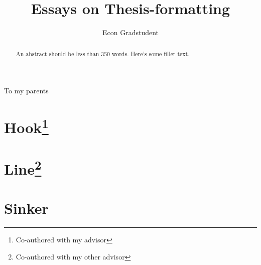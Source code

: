\documentclass[12pt]{gsasthesis} %
\title{Essays on Thesis-formatting}
\author{Econ Gradstudent} %
\begin{document}


\thesistitlepage
\copyrightpage
\begin{abstract}
  An abstract should be less than 350 words. Here's some filler text. \blindtext
\end{abstract}
\tableofcontents %

\listoftables
\listoffigures
\begin{acknowledgments}
  \blindtext
\end{acknowledgments}
\begin{dedication}
  To my parents
\end{dedication}



\chapter{Hook\footnote{Co-authored with my advisor}}\label{ch:1}


\chapter{Line\footnote{Co-authored with my other advisor}}\label{ch:2}


\chapter{Sinker}\label{ch:3}




\begin{singlespacing}
  \renewcommand{\bibname}{References}

  
  
\end{singlespacing}


\end{document}
